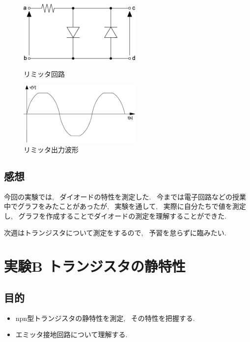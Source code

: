 \documentclass[uplatex,dvipdfmx,a4paper,js=standard, titlepage]{bxjsarticle}
\begin{document}
            \begin{figure}[ht]
                \begin{minipage}{0.5\hsize}
                    \begin{center}
                        \includegraphics[width=6cm]{images/limitter.eps}
                        \caption{リミッタ回路}
                        \label{fig:limitter}
                    \end{center}
                \end{minipage}
                \begin{minipage}{0.5\hsize}
                    \begin{center}
                        \includegraphics[width=6cm]{graphs/limitter_graph.eps}
                        \caption{リミッタ出力波形}
                        \label{fig:limitter_graph}
                    \end{center}
                \end{minipage}
            \end{figure}

    \subsection{感想}
        今回の実験では, ~ダイオードの特性を測定した.
        ~今までは電子回路などの授業中でグラフをみたことがあったが,
        ~実験を通して, ~実際に自分たちで値を測定し, ~グラフを作成することでダイオードの測定を理解することができた.

        次週はトランジスタについて測定をするので, ~予習を怠らずに臨みたい.

\section{実験B トランジスタの静特性}
    \subsection{目的}
        \begin{itemize}
            \item npn型トランジスタの静特性を測定, ~その特性を把握する.
            \item エミッタ接地回路について理解する.
        \end{itemize}
\end{document}
